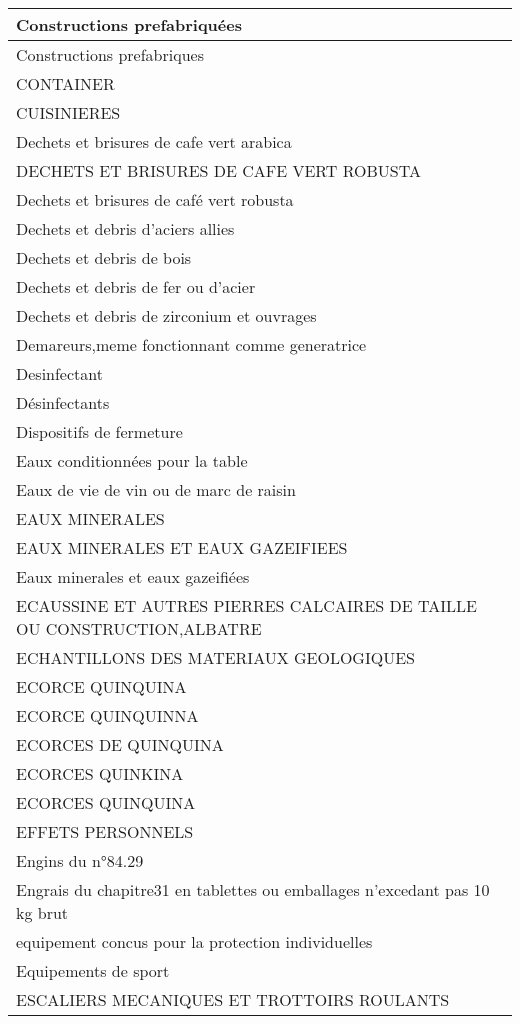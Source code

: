 \documentclass[
]{book}
\begin{document}
\begin{table}
\begin{tabular}[t]{l}
\hline
Constructions prefabriquées\\
\hline
Constructions prefabriques\\
\hline
CONTAINER\\
\hline
CUISINIERES\\
\hline
Dechets et brisures de cafe vert arabica\\
\hline
DECHETS ET BRISURES DE CAFE VERT ROBUSTA\\
\hline
Dechets et brisures de café vert robusta\\
\hline
Dechets et debris d'aciers allies\\
\hline
Dechets et debris de bois\\
\hline
Dechets et debris de fer ou d'acier\\
\hline
Dechets et debris de zirconium et ouvrages\\
\hline
Demareurs,meme fonctionnant comme generatrice\\
\hline
Desinfectant\\
\hline
Désinfectants\\
\hline
Dispositifs de fermeture\\
\hline
Eaux conditionnées pour la table\\
\hline
Eaux de vie de vin ou de marc de raisin\\
\hline
EAUX MINERALES\\
\hline
EAUX MINERALES ET EAUX GAZEIFIEES\\
\hline
Eaux minerales et eaux gazeifiées\\
\hline
ECAUSSINE ET AUTRES PIERRES CALCAIRES DE TAILLE OU CONSTRUCTION,ALBATRE\\
\hline
ECHANTILLONS DES MATERIAUX GEOLOGIQUES\\
\hline
ECORCE QUINQUINA\\
\hline
ECORCE QUINQUINNA\\
\hline
ECORCES DE QUINQUINA\\
\hline
ECORCES QUINKINA\\
\hline
ECORCES QUINQUINA\\
\hline
EFFETS PERSONNELS\\
\hline
Engins du n°84.29\\
\hline
Engrais du chapitre31 en tablettes ou emballages n'excedant pas 10 kg brut\\
\hline
equipement concus pour la protection individuelles\\
\hline
Equipements de sport\\
\hline
ESCALIERS MECANIQUES ET TROTTOIRS ROULANTS\\

\end{tabular}
\end{table}
\end{document}
